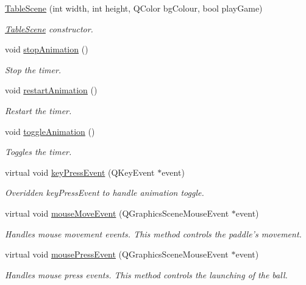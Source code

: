 \begin{DoxyCompactItemize}
\item 
\hyperlink{class_table_scene_aa130b4504c41933d28f83d707250592f}{Table\+Scene} (int width, int height, Q\+Color bg\+Colour, bool play\+Game)
\begin{DoxyCompactList}\small\item\em \hyperlink{class_table_scene}{Table\+Scene} constructor. \end{DoxyCompactList}\item 
\hypertarget{class_table_scene_aa0cf9de7b0d0b277f22fa743169d5679}{void \hyperlink{class_table_scene_aa0cf9de7b0d0b277f22fa743169d5679}{stop\+Animation} ()}\label{class_table_scene_aa0cf9de7b0d0b277f22fa743169d5679}

\begin{DoxyCompactList}\small\item\em Stop the timer. \end{DoxyCompactList}\item 
\hypertarget{class_table_scene_aa4cf493a3e1764d7a71a3cca8e02e476}{void \hyperlink{class_table_scene_aa4cf493a3e1764d7a71a3cca8e02e476}{restart\+Animation} ()}\label{class_table_scene_aa4cf493a3e1764d7a71a3cca8e02e476}

\begin{DoxyCompactList}\small\item\em Restart the timer. \end{DoxyCompactList}\item 
\hypertarget{class_table_scene_a8af53c9bb4da1dbadaa337c60473b24d}{void \hyperlink{class_table_scene_a8af53c9bb4da1dbadaa337c60473b24d}{toggle\+Animation} ()}\label{class_table_scene_a8af53c9bb4da1dbadaa337c60473b24d}

\begin{DoxyCompactList}\small\item\em Toggles the timer. \end{DoxyCompactList}\item 
virtual void \hyperlink{class_table_scene_adf3ccbff20b72a0badc1cb0d3f4e9e67}{key\+Press\+Event} (Q\+Key\+Event $\ast$event)
\begin{DoxyCompactList}\small\item\em Overidden key\+Press\+Event to handle animation toggle. \end{DoxyCompactList}\item 
virtual void \hyperlink{class_table_scene_a90f09546716546a0132e89cde6fa6407}{mouse\+Move\+Event} (Q\+Graphics\+Scene\+Mouse\+Event $\ast$event)
\begin{DoxyCompactList}\small\item\em Handles mouse movement events. This method controls the paddle's movement. \end{DoxyCompactList}\item 
virtual void \hyperlink{class_table_scene_adff7918b7b6041d6ec4f30542686c5d0}{mouse\+Press\+Event} (Q\+Graphics\+Scene\+Mouse\+Event $\ast$event)
\begin{DoxyCompactList}\small\item\em Handles mouse press events. This method controls the launching of the ball. \end{DoxyCompactList}\end{DoxyCompactItemize}


